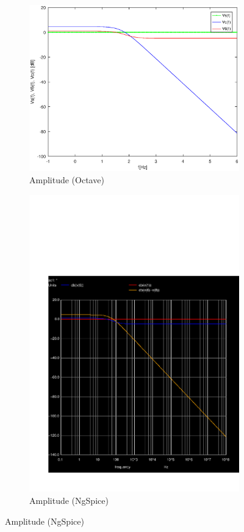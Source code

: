 \begin{figure}[H] 
\centering
\begin{subfigure}{0.5\textwidth}
\includegraphics[width=\textwidth]{Amplitude.eps}
\caption{Amplitude (Octave)}
\label{fig:first}
\end{subfigure}
\begin{subfigure}{0.42\textwidth}
\includegraphics[width=\textwidth]{sim5_db.pdf}
\caption{Amplitude (NgSpice)}
\label{fig:second}
\end{subfigure}
\end{figure}

